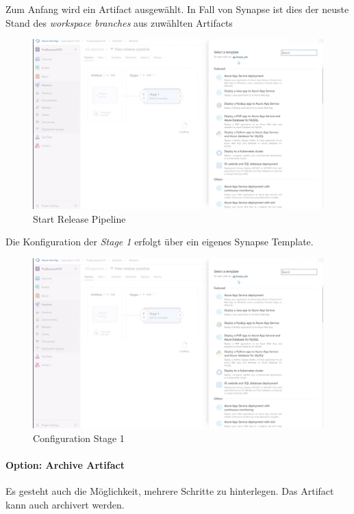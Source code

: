 Zum Anfang wird ein Artifact ausgewählt. In Fall von Synapse ist dies der neuste Stand des \textit{workspace branches} aus zuwählten Artifacts

\begin{figure}[H]
	\centering
	\includegraphics[scale = 0.2]{attachment/chapter_2/Scc153}
	\caption{Start Release Pipeline} 
\end{figure}

Die Konfiguration der \textit{Stage 1} erfolgt über ein eigenes Synapse Template.

\begin{figure}[H]
	\centering
	\includegraphics[scale = 0.2] {attachment/chapter_2/Scc153}
	\caption{Configuration Stage 1}
\end{figure}

\paragraph{Option: Archive Artifact}
Es gesteht auch die Möglichkeit, mehrere Schritte zu hinterlegen. 
Das Artifact kann auch archivert werden.

